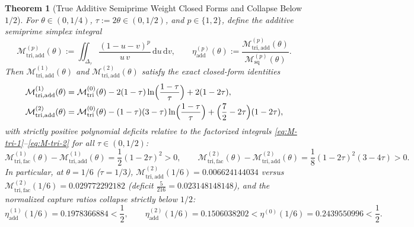 \documentclass[11pt,reqno]{amsart}
\newtheorem{theorem}{Theorem}[section]
\theoremstyle{definition}
\theoremstyle{remark}
\numberwithin{equation}{section}
\newcommand{\dd}{\mathrm{d}}
\newcommand{\tri}{\mathrm{tri}}
\newcommand{\sq}{\mathrm{sq}}
\newcommand{\facw}{\mathrm{fac}}
\newcommand{\addw}{\mathrm{add}}
\begin{document}
\begin{theorem}[True Additive Semiprime Weight Closed Forms and Collapse Below $1/2$]\label{thm:additive-collapse}
For $\theta \in (0,1/4)$, $\tau := 2\theta \in (0,1/2)$, and $p \in \{1,2\}$, define the additive semiprime simplex integral
\begin{equation}\label{eq:M-tri-add-def}
\mathcal{M}_{\tri,\addw}^{(p)}(\theta) := \iint_{\Delta_\tau} \frac{(1 - u - v)^p}{u\,v}\,\dd u\,\dd v, \qquad \eta_{\addw}^{(p)}(\theta) := \frac{\mathcal{M}_{\tri,\addw}^{(p)}(\theta)}{\mathcal{M}_{\sq}^{(p)}(\theta)}.
\end{equation}
Then $\mathcal{M}_{\tri,\addw}^{(1)}(\theta)$ and $\mathcal{M}_{\tri,\addw}^{(2)}(\theta)$ satisfy the exact closed-form identities
\begin{align}
\mathcal{M}_{\tri,\addw}^{(1)}(\theta) &= \mathcal{M}_{\tri}^{(0)}(\theta) - 2(1-\tau)\ln\Bigl(\frac{1-\tau}{\tau}\Bigr) + 2(1-2\tau), \label{eq:M-tri-add-1} \\
\mathcal{M}_{\tri,\addw}^{(2)}(\theta) &= \mathcal{M}_{\tri}^{(0)}(\theta) - (1-\tau)(3-\tau)\ln\Bigl(\frac{1-\tau}{\tau}\Bigr) + \Bigl(\frac{7}{2} - 2\tau\Bigr)(1-2\tau), \label{eq:M-tri-add-2}
\end{align}
with strictly positive polynomial deficits relative to the factorized integrals \eqref{eq:M-tri-1}--\eqref{eq:M-tri-2} for all $\tau \in (0,1/2)$:
\begin{equation}\label{eq:fac-minus-add}
\mathcal{M}_{\tri,\facw}^{(1)}(\theta) - \mathcal{M}_{\tri,\addw}^{(1)}(\theta) = \frac{1}{2}(1-2\tau)^2 > 0, \qquad \mathcal{M}_{\tri,\facw}^{(2)}(\theta) - \mathcal{M}_{\tri,\addw}^{(2)}(\theta) = \frac{1}{8}(1-2\tau)^2(3 - 4\tau) > 0.
\end{equation}
In particular, at $\theta = 1/6$ ($\tau = 1/3$), $\mathcal{M}_{\tri,\addw}^{(2)}(1/6) = 0.006624144034$ versus $\mathcal{M}_{\tri,\facw}^{(2)}(1/6) = 0.029772292182$ (deficit $\frac{5}{216} = 0.023148148148$), and the normalized capture ratios collapse strictly below $1/2$:
\begin{equation}\label{eq:eta-add-collapse}
\eta_{\addw}^{(1)}(1/6) = 0.1978366884 < \frac{1}{2}, \qquad \eta_{\addw}^{(2)}(1/6) = 0.1506038202 < \eta^{(0)}(1/6) = 0.2439550996 < \frac{1}{2}.
\end{equation}
\end{theorem}
\end{document}
